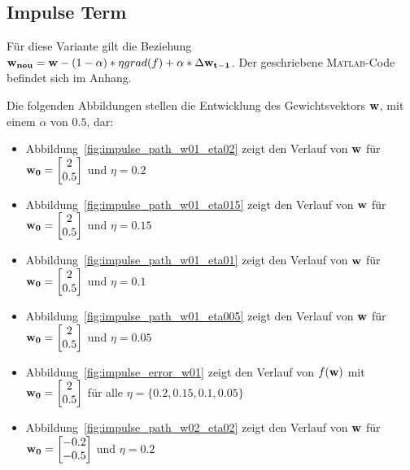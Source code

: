\subsection{Impulse Term}

Für diese Variante gilt die Beziehung $ \mathbf{w_{neu}} = \mathbf{w} - (1- \alpha)* \eta grad(f)  + \alpha * \Delta \mathbf{w_{t-1}}$. Der geschriebene \textsc{Matlab}-Code befindet sich im Anhang.

Die folgenden Abbildungen stellen die Entwicklung des Gewichtsvektors $\mathbf{w}$, mit einem $\alpha$ von $0.5$, dar:

\begin{itemize}
  \item Abbildung~\ref{fig:impulse_path_w01_eta02} zeigt den Verlauf von $\mathbf{w}$ für $\mathbf{w_0} = \begin{bmatrix} 2 \\ 0.5 \end{bmatrix}$ und $\eta = 0.2$
  \item Abbildung~\ref{fig:impulse_path_w01_eta015} zeigt den Verlauf von $\mathbf{w}$ für $\mathbf{w_0} = \begin{bmatrix} 2 \\ 0.5 \end{bmatrix}$ und $\eta = 0.15$
  \item Abbildung~\ref{fig:impulse_path_w01_eta01} zeigt den Verlauf von $\mathbf{w}$ für $\mathbf{w_0} = \begin{bmatrix} 2 \\ 0.5 \end{bmatrix}$ und $\eta = 0.1$
  \item Abbildung~\ref{fig:impulse_path_w01_eta005} zeigt den Verlauf von $\mathbf{w}$ für $\mathbf{w_0} = \begin{bmatrix} 2 \\ 0.5 \end{bmatrix}$ und $\eta = 0.05$
  \item Abbildung~\ref{fig:impulse_error_w01} zeigt den Verlauf von $f(\mathbf{w})$ mit $\mathbf{w_0} = \begin{bmatrix} 2 \\ 0.5 \end{bmatrix}$ für alle $\eta = \{0.2, 0.15, 0.1, 0.05\}$
  \item Abbildung~\ref{fig:impulse_path_w02_eta02} zeigt den Verlauf von $\mathbf{w}$ für $\mathbf{w_0} = \begin{bmatrix} -0.2 \\ -0.5 \end{bmatrix}$ und $\eta = 0.2$

\end{itemize}
